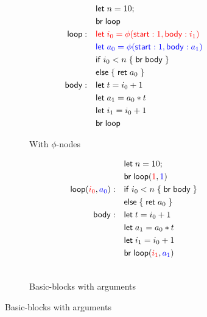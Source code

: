 \documentclass[acmsmall,screen,review]{acmart}
\newcommand{\ms}[1]{\ensuremath{\mathsf{#1}}}
\begin{document}
\begin{figure}
  \begin{subfigure}[t]{.5\textwidth}
    \centering
    \begin{align*}
                        & \ms{let}\;n = 10; \\
                        & \ms{br}\;\ms{loop} \\
      \ms{loop}: \quad  & \begingroup \color{red}
                          \ms{let}\;i_0 = \phi(\ms{start}: 1, \ms{body}: i_1) 
                          \endgroup \\
                        & \begingroup \color{blue}
                          \ms{let}\;a_0 = \phi(\ms{start}: 1, \ms{body}: a_1) 
                          \endgroup \\
                        & \ms{if}\;i_0 < n\;\{\;\ms{br}\;\ms{body}\;\} \\
                        & \ms{else}\;\{\;\ms{ret}\;a_0\;\} \\
      \ms{body}: \quad  & \ms{let}\;t = i_0 + 1 \\
                        & \ms{let}\;a_1 = a_0 * t \\
                        & \ms{let}\;i_1 = i_0 + 1 \\
                        & \ms{br}\;\ms{loop}
    \end{align*}
    \caption{With $\phi$-nodes}
    \label{fig:fact-phi}
  \end{subfigure}%
  \begin{subfigure}[t]{.5\textwidth}
    \centering
    \begin{align*}
                                  & \ms{let}\;n = 10; \\
                                  & \ms{br}\;\ms{loop}(\textcolor{red}{1}, \textcolor{blue}{1}) \\
      \ms{loop}(\textcolor{red}{i_0}, \textcolor{blue}{a_0}): \quad  
                                  & \ms{if}\;i_0 < n\; \{\;\ms{br}\;\ms{body}\;\} \\
                                  & \ms{else}\;\{\;\ms{ret}\;a_0\;\} \\
      \ms{body}: \quad            & \ms{let}\;t = i_0 + 1 \\
                                  & \ms{let}\;a_1 = a_0 * t \\
                                  & \ms{let}\;i_1 = i_0 + 1 \\
                                  & \ms{br}\;\ms{loop}(\textcolor{red}{i_1}, \textcolor{blue}{a_1}) 
                                  \\ \\
    \end{align*}
    \caption{Basic-blocks with arguments}
    \label{fig:fact-bba}
  \end{subfigure}
  

\end{figure}
\end{document}
